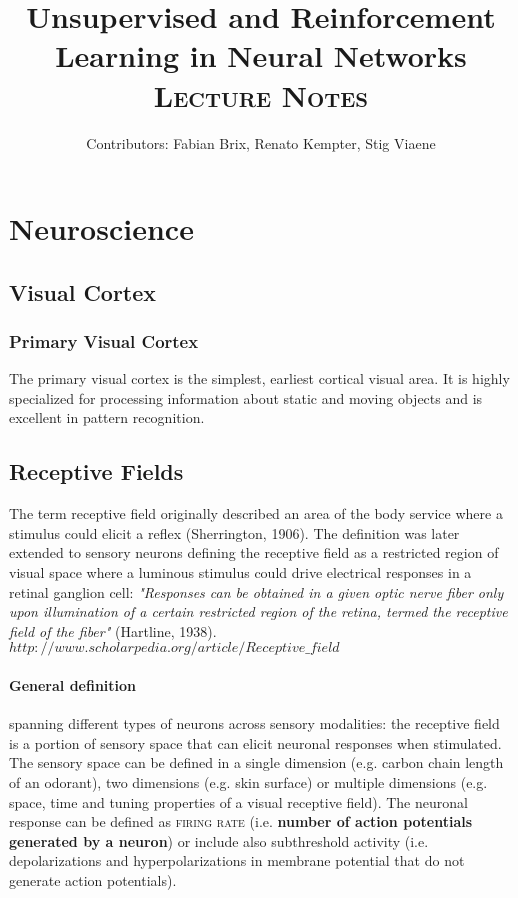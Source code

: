 \documentclass[11pt]{article}
\title{Unsupervised and Reinforcement Learning in Neural Networks\\\Huge \textsc{Lecture Notes}}
\author{Contributors: Fabian Brix, Renato Kempter, Stig Viaene}
\begin{document}
\maketitle
\tableofcontents

\section{Neuroscience}

\subsection{Visual Cortex}

\subsubsection{Primary Visual Cortex}
The primary visual cortex is the simplest, earliest cortical visual area. It is highly specialized for processing information about static and moving objects and is excellent in pattern recognition.

\subsection{Receptive Fields}
The term receptive field originally described an area of the body service where a stimulus could elicit a reflex (Sherrington, 1906). The definition was later extended to sensory neurons defining the receptive field as a restricted region of visual space where a luminous stimulus could drive electrical responses in a retinal ganglion cell: \textit{"Responses can be obtained in a given optic nerve fiber only upon illumination of a certain restricted region of the retina, termed the receptive field of the fiber"} (Hartline, 1938).
$http://www.scholarpedia.org/article/Receptive\_field$
\paragraph*{General definition} spanning different types of neurons across sensory modalities: the receptive field is a portion of sensory space that can elicit neuronal responses when stimulated. The sensory space can be defined in a single dimension (e.g. carbon chain length of an odorant), two dimensions (e.g. skin surface) or multiple dimensions (e.g. space, time and tuning properties of a visual receptive field). The neuronal response can be defined as \textsc{firing rate} (i.e. \textbf{number of action potentials generated by a neuron}) or include also subthreshold activity (i.e. depolarizations and hyperpolarizations in membrane potential that do not generate action potentials).
\end{document}
